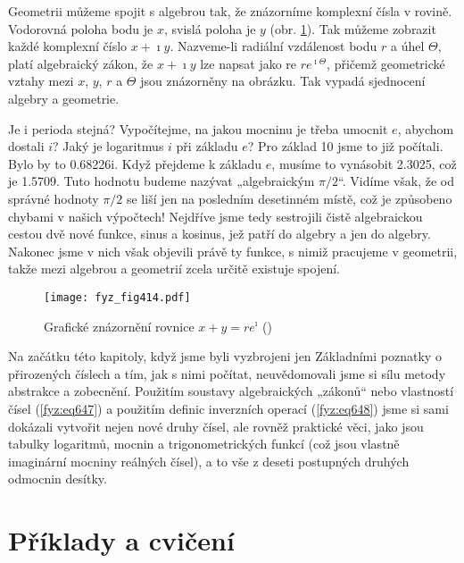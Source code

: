    Geometrii můžeme spojit s algebrou tak, že znázorníme komplexní čísla v rovině. Vodorovná poloha
    bodu je \(x\), svislá poloha je \(y\) (obr. \ref{fyz:fig414}). Tak můžeme zobrazit každé
    komplexní číslo \(x + \imath y\). Nazveme-li radiální vzdálenost bodu \(r\) a úhel
    \(\varTheta\), platí algebraický zákon, že \(x + \imath y\) lze napsat jako re
    \(re^{\imath\varTheta}\), přičemž geometrické vztahy mezi \(x\), \(y\), \(r\) a \(\varTheta\)
    jsou znázorněny na obrázku. Tak vypadá sjednocení algebry a geometrie.

    Je i perioda stejná? Vypočítejme, na jakou mocninu je třeba umocnit \(e\), abychom dostali
    \(i\)? Jaký je logaritmus \(i\) při základu \(e\)? Pro základ \num{10} jsme to již počítali.
    Bylo by to \num{0.68226i}. Když přejdeme k základu \(e\), musíme to vynásobit \num{2.3025}, což
    je \num{1.5709}. Tuto hodnotu budeme nazývat „algebraickým \(\pi/2\)“. Vidíme však, že od
    správné hodnoty \(\pi/2\) se liší jen na posledním desetinném místě, což je způsobeno chybami v
    našich výpočtech! Nejdříve jsme tedy sestrojili čistě algebraickou cestou dvě nové funkce, sinus
    a kosinus, jež patří do algebry a jen do algebry. Nakonec jsme v nich však objevili právě ty
    funkce, s nimiž pracujeme v geometrii, takže mezi algebrou a geometrií zcela určitě existuje
    spojení.


    \begin{figure}[ht!] %
      \centering
      \texttt{[image: fyz\_fig414.pdf]}
      \caption{Grafické znázornění rovnice \(x + y = re^\imath\) (\cite[s.~306]{Feynman01})}
      \label{fyz:fig414}
    \end{figure}

    Na začátku této kapitoly, když jsme byli vyzbrojeni jen Základními poznatky o přirozených
    číslech a tím, jak s nimi počítat, neuvědomovali jsme si sílu metody abstrakce a zobecnění.
    Použitím soustavy algebraických „zákonů“ nebo vlastností čísel (\ref{fyz:eq647}) a použitím
    deﬁnic inverzních operací (\ref{fyz:eq648}) jsme si sami dokázali vytvořit nejen nové druhy
    čísel, ale rovněž praktické věci, jako jsou tabulky logaritmů, mocnin a trigonometrických funkcí
    (což jsou vlastně imaginární mocniny reálných čísel), a to vše z deseti postupných druhých
    odmocnin desítky.

  \section{Příklady a cvičení}\label{fyz:IchapXXIIsecVIII}
